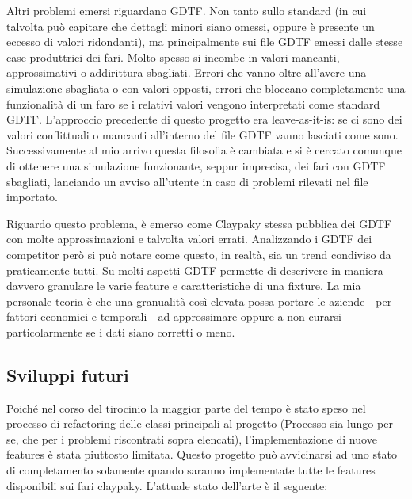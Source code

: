 \documentclass[main.tex]{subfiles}
\begin{document}
Altri problemi emersi riguardano GDTF. Non tanto sullo standard (in cui talvolta può capitare che dettagli minori siano omessi, oppure è presente un eccesso di valori ridondanti), ma principalmente sui file GDTF emessi dalle stesse case produttrici dei fari. Molto spesso si incombe in valori mancanti, approssimativi o addirittura sbagliati. Errori che vanno oltre all'avere una simulazione sbagliata o con valori opposti, errori che bloccano completamente una funzionalità di un faro se i relativi valori vengono interpretati come standard GDTF. L'approccio precedente di questo progetto era leave-as-it-is: se ci sono dei valori conflittuali o mancanti all'interno del file GDTF vanno lasciati come sono. Successivamente al mio arrivo questa filosofia è cambiata e si è cercato comunque di ottenere una simulazione funzionante, seppur imprecisa, dei fari con GDTF sbagliati, lanciando un avviso all'utente in caso di problemi rilevati nel file importato.

Riguardo questo problema, è emerso come Claypaky stessa pubblica dei GDTF con molte approssimazioni e talvolta valori errati. Analizzando i GDTF dei competitor però si può notare come questo, in realtà, sia un trend condiviso da praticamente tutti. Su molti aspetti GDTF permette di descrivere in maniera davvero granulare le varie feature e caratteristiche di una fixture. La mia personale teoria è che una granualità così elevata possa portare le aziende - per fattori economici e temporali - ad approssimare oppure a non curarsi particolarmente se i dati siano corretti o meno. 

\subsection{Sviluppi futuri}\label{subsec:6_newDevelops}
Poiché nel corso del tirocinio la maggior parte del tempo è stato speso nel processo di refactoring delle classi principali al progetto (Processo sia lungo per se, che per i problemi riscontrati sopra elencati), l'implementazione di nuove features è stata piuttosto limitata. Questo progetto può avvicinarsi ad uno stato di completamento solamente quando saranno implementate tutte le features disponibili sui fari claypaky. L'attuale stato dell'arte è il seguente: \newline
\end{document}
